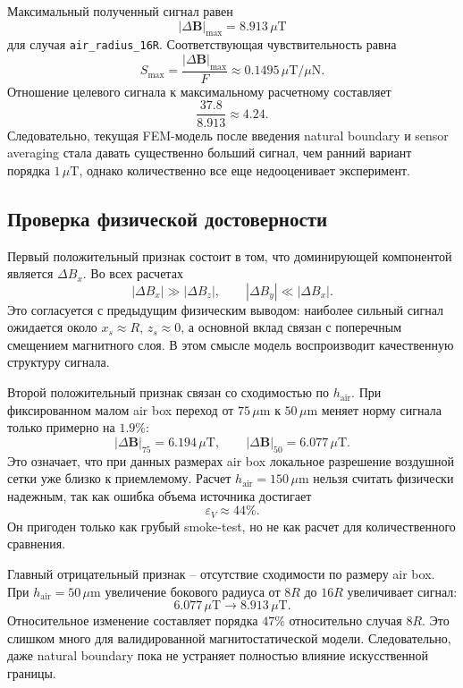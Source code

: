 \documentclass[12pt,a4paper]{article}
\begin{document}
Максимальный полученный сигнал равен
\[
    |\Delta\mathbf B|_{\max} = 8.913\,\mu\mathrm{T}
\]
для случая \texttt{air\_radius\_16R}. Соответствующая чувствительность равна
\[
    S_{\max}
    =
    \frac{|\Delta\mathbf B|_{\max}}{F}
    \approx
    0.1495\,\mu\mathrm{T}/\mu\mathrm{N}.
\]
Отношение целевого сигнала к максимальному расчетному составляет
\[
    \frac{37.8}{8.913}\approx 4.24.
\]
Следовательно, текущая FEM-модель после введения natural boundary и sensor
averaging стала давать существенно больший сигнал, чем ранний вариант порядка
\(1\,\mu\mathrm{T}\), однако количественно все еще недооценивает эксперимент.

\subsection*{Проверка физической достоверности}

Первый положительный признак состоит в том, что доминирующей компонентой
является \(\Delta B_x\). Во всех расчетах
\[
    |\Delta B_x| \gg |\Delta B_z|,\qquad |\Delta B_y|\ll |\Delta B_x|.
\]
Это согласуется с предыдущим физическим выводом: наиболее сильный сигнал
ожидается около \(x_s\approx R\), \(z_s\approx 0\), а основной вклад связан с
поперечным смещением магнитного слоя. В этом смысле модель воспроизводит
качественную структуру сигнала.

Второй положительный признак связан со сходимостью по \(h_{\mathrm{air}}\).
При фиксированном малом air box переход от \(75\,\mu\mathrm{m}\) к
\(50\,\mu\mathrm{m}\) меняет норму сигнала только примерно на \(1.9\%\):
\[
    |\Delta\mathbf B|_{75}=6.194\,\mu\mathrm{T},\qquad
    |\Delta\mathbf B|_{50}=6.077\,\mu\mathrm{T}.
\]
Это означает, что при данных размерах air box локальное разрешение воздушной
сетки уже близко к приемлемому. Расчет \(h_{\mathrm{air}}=150\,\mu\mathrm{m}\)
нельзя считать физически надежным, так как ошибка объема источника достигает
\[
    \varepsilon_V \approx 44\%.
\]
Он пригоден только как грубый smoke-test, но не как расчет для количественного
сравнения.

Главный отрицательный признак -- отсутствие сходимости по размеру air box.
При \(h_{\mathrm{air}}=50\,\mu\mathrm{m}\) увеличение бокового радиуса от
\(8R\) до \(16R\) увеличивает сигнал:
\[
    6.077\,\mu\mathrm{T}
    \rightarrow
    8.913\,\mu\mathrm{T}.
\]
Относительное изменение составляет порядка \(47\%\) относительно случая \(8R\).
Это слишком много для валидированной магнитостатической модели. Следовательно,
даже natural boundary пока не устраняет полностью влияние искусственной
границы.
\end{document}
